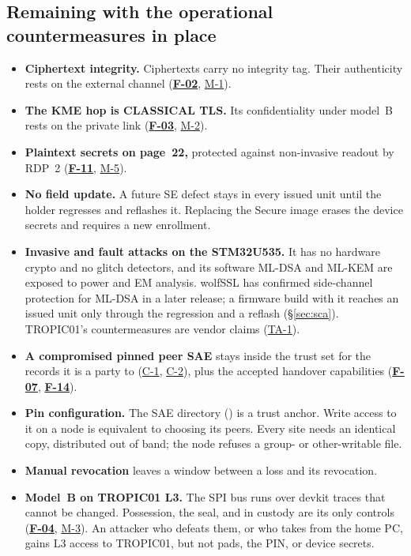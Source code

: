 \documentclass[11pt,a4paper]{article}
\newcommand{\fid}[1]{\textbf{#1}}
\begin{document}
\subsection{Remaining with the operational countermeasures in place}
\begin{itemize}
\item \textbf{Ciphertext integrity.} Ciphertexts carry no integrity tag. Their authenticity rests on the external channel (\hyperref[f:F-02]{\fid{F-02}}, \hyperref[m:M-1]{M-1}).
\item \textbf{The KME hop is CLASSICAL TLS.} Its confidentiality under model~B rests on the private link (\hyperref[f:F-03]{\fid{F-03}}, \hyperref[m:M-2]{M-2}).
\item \textbf{Plaintext secrets on page~22,} protected against non-invasive readout by RDP~2 (\hyperref[f:F-11]{\fid{F-11}}, \hyperref[m:M-5]{M-5}).
\item \textbf{No field update.} A future SE defect stays in every issued unit until the  holder regresses and reflashes it. Replacing the Secure image erases the device secrets and requires a new enrollment.
\item \textbf{Invasive and fault attacks on the STM32U535.} It has no hardware crypto and no glitch detectors, and its software ML-DSA and ML-KEM are exposed to power and EM analysis. wolfSSL has confirmed side-channel protection for ML-DSA in a later release; a firmware build with it reaches an issued unit only through the  regression and a reflash (\S\ref{sec:sca}). TROPIC01's countermeasures are vendor claims (\hyperref[ta:TA-1]{TA-1}).
\item \textbf{A compromised pinned peer SAE} stays inside the trust set for the records it is a party to (\hyperref[c:C-1]{C-1}, \hyperref[c:C-2]{C-2}), plus the accepted handover capabilities (\hyperref[f:F-07]{\fid{F-07}}, \hyperref[f:F-14]{\fid{F-14}}).
\item \textbf{Pin configuration.} The SAE directory () is a trust anchor. Write access to it on a node is equivalent to choosing its peers. Every site needs an identical copy, distributed out of band; the node refuses a group- or other-writable file.
\item \textbf{Manual revocation} leaves a window between a loss and its revocation.
\item \textbf{Model~B on TROPIC01 L3.} The SPI bus runs over devkit traces that cannot be changed. Possession, the seal, and  in custody are its only controls (\hyperref[f:F-04]{\fid{F-04}}, \hyperref[m:M-3]{M-3}). An attacker who defeats them, or who takes  from the home PC, gains L3 access to TROPIC01, but not pads, the PIN, or device secrets.
\end{itemize}
\end{document}
